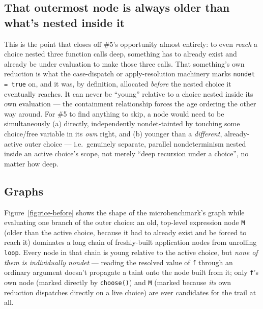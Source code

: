 \documentclass[11pt]{article}
\begin{document}
\subsection{That outermost node is always older than what's nested inside it}

This is the point that closes off \#5's opportunity almost entirely: to
even \emph{reach} a choice nested three function calls deep, something
has to already exist and already be under evaluation to make those three
calls. That something's own reduction is what the case-dispatch or
apply-resolution machinery marks \texttt{nondet = true} on, and it was, by
definition, allocated \emph{before} the nested choice it eventually
reaches. It can never be ``young'' relative to a choice nested inside its
own evaluation --- the containment relationship forces the age ordering
the other way around. For \#5 to find anything to skip, a node would need
to be simultaneously (a) directly, independently nondet-tainted by
touching some choice/free variable in its \emph{own} right, and (b)
younger than a \emph{different}, already-active outer choice --- i.e.\
genuinely separate, parallel nondeterminism nested inside an active
choice's scope, not merely ``deep recursion under a choice'', no matter
how deep.

\subsection{Graphs}

Figure~\ref{fig:rice-before} shows the shape of the microbenchmark's graph
while evaluating one branch of the outer choice: an old, top-level
expression node \texttt{M} (older than the active choice, because it had
to already exist and be forced to reach it) dominates a long chain of
freshly-built application nodes from unrolling \texttt{loop}. Every node
in that chain is young relative to the active choice, but \emph{none of
them is individually nondet} --- reading the resolved value of \texttt{f}
through an ordinary argument doesn't propagate a taint onto the node built
from it; only \texttt{f}'s own node (marked directly by \texttt{choose()})
and \texttt{M} (marked because \emph{its} own reduction dispatches
directly on a live choice) are ever candidates for the trail at all.
\end{document}
